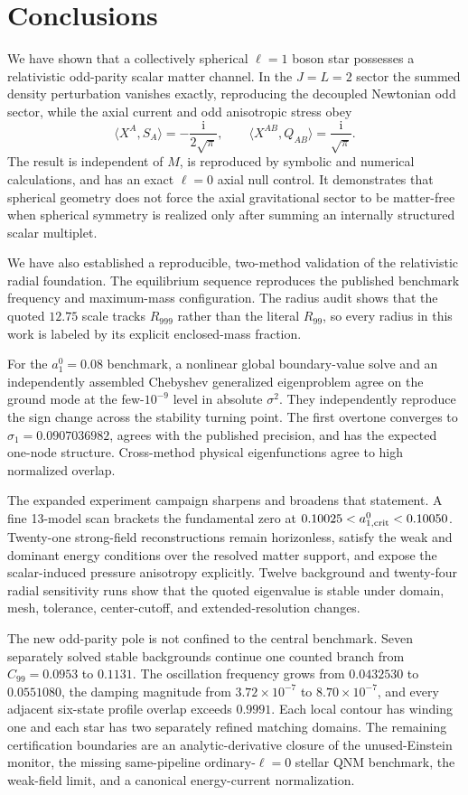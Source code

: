 \documentclass[aps,prd,preprint,onecolumn,nofootinbib,superscriptaddress,showkeys]{revtex4-2}
\newcommand{\ii}{\mathrm{i}}
\newcommand{\sigmatwo}{\sigma^{2}}
\begin{document}
\section{Conclusions}

We have shown that a collectively spherical $\ell=1$ boson star possesses a
relativistic odd-parity scalar matter channel. In the $J=L=2$ sector the
summed density perturbation vanishes exactly, reproducing the decoupled
Newtonian odd sector, while the axial current and odd anisotropic stress obey
\[
\langle X^{A},S_A\rangle=-\frac{\ii}{2\sqrt\pi},
\qquad
\langle X^{AB},Q_{AB}\rangle=\frac{\ii}{\sqrt\pi}.
\]
The result is independent of $M$, is reproduced by symbolic and numerical
calculations, and has an exact $\ell=0$ axial null control. It demonstrates
that spherical geometry does not force the axial gravitational sector to be
matter-free when spherical symmetry is realized only after summing an
internally structured scalar multiplet.

We have also established a reproducible, two-method validation of the
relativistic radial foundation. The equilibrium sequence reproduces the
published benchmark frequency and maximum-mass configuration. The radius
audit shows that the quoted $12.75$ scale tracks $R_{999}$ rather than the
literal $R_{99}$, so every radius in this work is labeled by its explicit
enclosed-mass fraction.

For the $a_{1}^{0}=0.08$ benchmark, a nonlinear global boundary-value solve and an independently assembled Chebyshev generalized eigenproblem agree on the ground mode at the few-$10^{-9}$ level in absolute $\sigmatwo$. They independently reproduce the sign change across the stability turning point. The first overtone converges to $\sigma_{1}=0.0907036982$, agrees with the published precision, and has the expected one-node structure. Cross-method physical eigenfunctions agree to high normalized overlap.

The expanded experiment campaign sharpens and broadens that statement. A fine 13-model scan brackets the fundamental zero at $0.10025<a_{1,\rm crit}^{0}<0.10050$. Twenty-one strong-field reconstructions remain horizonless, satisfy the weak and dominant energy conditions over the resolved matter support, and expose the scalar-induced pressure anisotropy explicitly. Twelve background and twenty-four radial sensitivity runs show that the quoted eigenvalue is stable under domain, mesh, tolerance, center-cutoff, and extended-resolution changes.

The new odd-parity pole is not confined to the central benchmark. Seven
separately solved stable backgrounds continue one counted branch from
$C_{99}=0.0953$ to $0.1131$. The oscillation frequency grows from
$0.0432530$ to $0.0551080$, the damping magnitude from
$3.72\times10^{-7}$ to $8.70\times10^{-7}$, and every adjacent six-state
profile overlap exceeds $0.9991$. Each local contour has winding one and each
star has two separately refined matching domains. The remaining certification
boundaries are an analytic-derivative closure of the unused-Einstein monitor, the missing same-pipeline
ordinary-$\ell=0$ stellar QNM benchmark, the weak-field limit, and a canonical
energy-current normalization.
\end{document}
